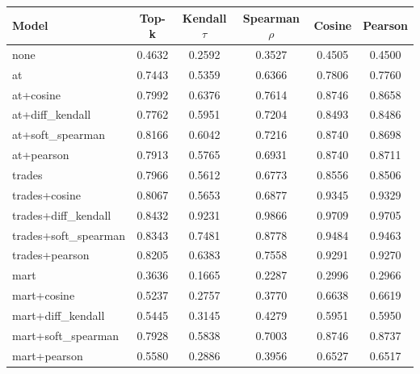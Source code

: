 \begin{tabular}{lccccc}
\toprule
Model & Top-k & Kendall $\tau$ & Spearman $\rho$ & Cosine & Pearson \\
\midrule
none & 0.4632 & 0.2592 & 0.3527 & 0.4505 & 0.4500 \\
at & 0.7443 & 0.5359 & 0.6366 & 0.7806 & 0.7760 \\
at+cosine & 0.7992 & 0.6376 & 0.7614 & 0.8746 & 0.8658 \\
at+diff_kendall & 0.7762 & 0.5951 & 0.7204 & 0.8493 & 0.8486 \\
at+soft_spearman & 0.8166 & 0.6042 & 0.7216 & 0.8740 & 0.8698 \\
at+pearson & 0.7913 & 0.5765 & 0.6931 & 0.8740 & 0.8711 \\
trades & 0.7966 & 0.5612 & 0.6773 & 0.8556 & 0.8506 \\
trades+cosine & 0.8067 & 0.5653 & 0.6877 & 0.9345 & 0.9329 \\
trades+diff_kendall & 0.8432 & 0.9231 & 0.9866 & 0.9709 & 0.9705 \\
trades+soft_spearman & 0.8343 & 0.7481 & 0.8778 & 0.9484 & 0.9463 \\
trades+pearson & 0.8205 & 0.6383 & 0.7558 & 0.9291 & 0.9270 \\
mart & 0.3636 & 0.1665 & 0.2287 & 0.2996 & 0.2966 \\
mart+cosine & 0.5237 & 0.2757 & 0.3770 & 0.6638 & 0.6619 \\
mart+diff_kendall & 0.5445 & 0.3145 & 0.4279 & 0.5951 & 0.5950 \\
mart+soft_spearman & 0.7928 & 0.5838 & 0.7003 & 0.8746 & 0.8737 \\
mart+pearson & 0.5580 & 0.2886 & 0.3956 & 0.6527 & 0.6517 \\
\bottomrule
\end{tabular}
